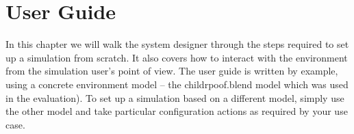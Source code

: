 \chapter{User Guide}\label{ch:user_guide}
In this chapter we will walk the system designer through the steps required to set up a simulation from scratch. It also covers how to interact with the environment from the simulation user's point of view. The user guide is written by example, using a concrete environment model -- the childrpoof.blend model which was used in the evaluation). To set up a simulation based on a different model, simply use the other model and take particular configuration actions as required by your use case.





